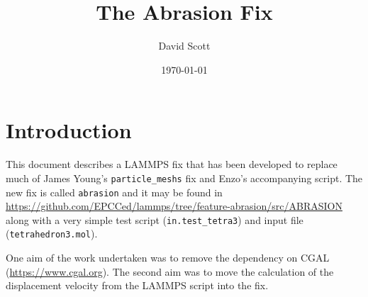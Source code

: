 \documentclass[11pt,a4paper]{article}
\title{The Abrasion Fix}
\author{David Scott}
\date{\today}
\begin{document}
	
\maketitle
	
\section*{Introduction}
This document describes a LAMMPS fix that has been developed to replace much of James Young's \verb|particle_meshs| fix and  Enzo's accompanying script. The new fix is called \verb|abrasion| and it may be found in\\
 \url{https://github.com/EPCCed/lammps/tree/feature-abrasion/src/ABRASION}\\
 along with a very simple test script (\verb|in.test_tetra3|) and input file\\
 (\verb|tetrahedron3.mol|).

One aim of the work undertaken was to remove the dependency on CGAL (\url{https://www.cgal.org}). The second aim was to move the calculation of the displacement velocity from the LAMMPS script into the fix.
\end{document}

